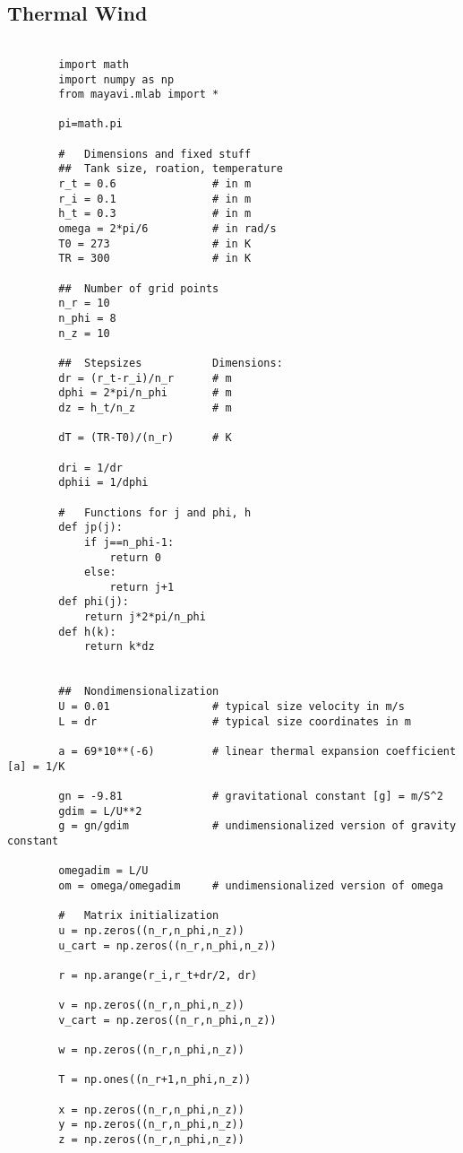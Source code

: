 \documentclass[12pt, a4paper]{article} %
\begin{document}
	\subsection{Thermal Wind}
	
		\begin{lstlisting}
		
		import math
		import numpy as np
		from mayavi.mlab import *
		
		pi=math.pi
		
		#   Dimensions and fixed stuff
		##  Tank size, roation, temperature
		r_t = 0.6               # in m
		r_i = 0.1               # in m
		h_t = 0.3               # in m
		omega = 2*pi/6          # in rad/s
		T0 = 273                # in K
		TR = 300				# in K
		
		##  Number of grid points
		n_r = 10
		n_phi = 8
		n_z = 10
		
		##  Stepsizes           Dimensions:
		dr = (r_t-r_i)/n_r      # m
		dphi = 2*pi/n_phi       # m
		dz = h_t/n_z            # m
		
		dT = (TR-T0)/(n_r)    	# K
		
		dri = 1/dr
		dphii = 1/dphi
		
		#   Functions for j and phi, h
		def jp(j):
		    if j==n_phi-1:
		        return 0
		    else:
		        return j+1
		def phi(j):
		    return j*2*pi/n_phi
		def h(k):
		    return k*dz
		
		
		##  Nondimensionalization
		U = 0.01                # typical size velocity in m/s
		L = dr                  # typical size coordinates in m
		
		a = 69*10**(-6)         # linear thermal expansion coefficient [a] = 1/K
		
		gn = -9.81              # gravitational constant [g] = m/S^2
		gdim = L/U**2
		g = gn/gdim             # undimensionalized version of gravity constant
		
		omegadim = L/U
		om = omega/omegadim     # undimensionalized version of omega
		
		#   Matrix initialization
		u = np.zeros((n_r,n_phi,n_z))      
		u_cart = np.zeros((n_r,n_phi,n_z))
		
		r = np.arange(r_i,r_t+dr/2, dr)
		
		v = np.zeros((n_r,n_phi,n_z))
		v_cart = np.zeros((n_r,n_phi,n_z))
		
		w = np.zeros((n_r,n_phi,n_z))
		
		T = np.ones((n_r+1,n_phi,n_z))
		
		x = np.zeros((n_r,n_phi,n_z))
		y = np.zeros((n_r,n_phi,n_z))
		z = np.zeros((n_r,n_phi,n_z))
		

\end{lstlisting}
\end{document}
